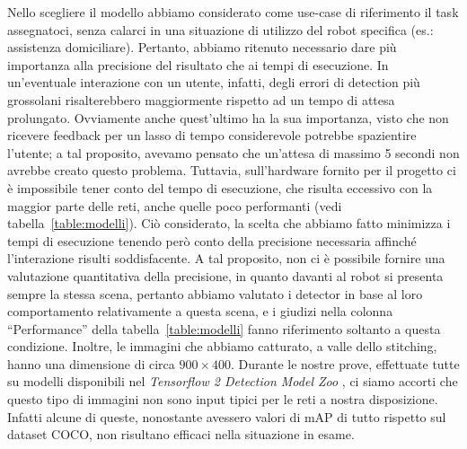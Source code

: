 Nello scegliere il modello abbiamo considerato come use-case di riferimento il task assegnatoci, senza calarci in una situazione di utilizzo del robot specifica (es.\@: assistenza domiciliare). Pertanto, abbiamo ritenuto necessario dare più importanza alla precisione del risultato che ai tempi di esecuzione. In un'eventuale interazione con un utente, infatti, degli errori di detection più grossolani risalterebbero maggiormente rispetto ad un tempo di attesa prolungato. Ovviamente anche quest'ultimo ha la sua importanza, visto che non ricevere feedback per un lasso di tempo considerevole potrebbe spazientire l'utente; a tal proposito, avevamo pensato che un'attesa di massimo 5 secondi non avrebbe creato questo problema.
Tuttavia, sull'hardware fornito per il progetto ci è impossibile tener conto del tempo di esecuzione, che risulta eccessivo con la maggior parte delle reti, anche quelle poco performanti (vedi tabella~\ref{table:modelli}). Ciò considerato, la scelta che abbiamo fatto minimizza i tempi di esecuzione tenendo però conto della precisione necessaria affinché l'interazione risulti soddisfacente.
A tal proposito, non ci è possibile fornire una valutazione quantitativa della precisione, in quanto davanti al robot si presenta sempre la stessa scena, pertanto abbiamo valutato i detector in base al loro comportamento relativamente a questa scena, e i giudizi nella colonna “Performance” della tabella~\ref{table:modelli} fanno riferimento soltanto a questa condizione. Inoltre, le immagini che abbiamo catturato, a valle dello stitching, hanno una dimensione di circa $900 \times 400$. Durante le nostre prove, effettuate tutte su modelli disponibili nel \emph{Tensorflow 2 Detection Model Zoo} \cite{modelzoo}, ci siamo accorti che questo tipo di immagini non sono input tipici per le reti a nostra disposizione. Infatti alcune di queste, nonostante avessero valori di mAP di tutto rispetto sul dataset COCO, non risultano efficaci nella situazione in esame.

